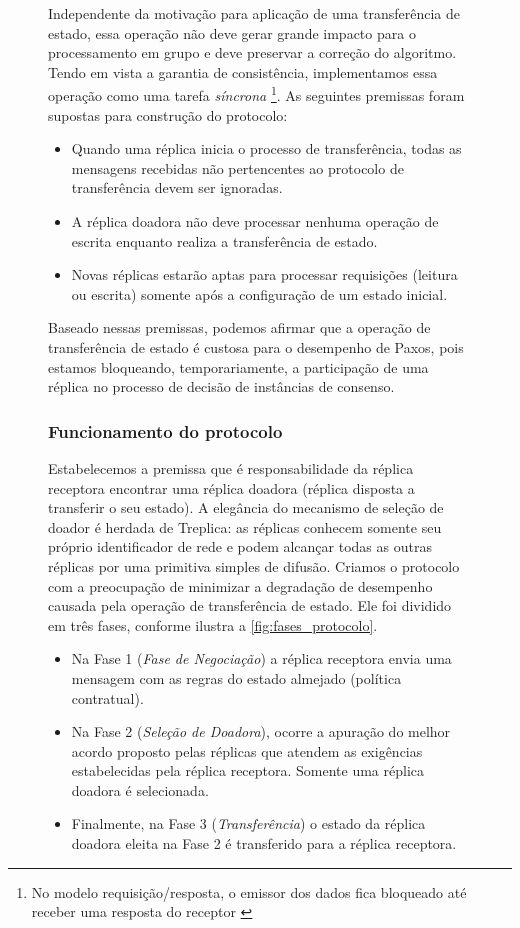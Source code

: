 \begin{figure}[ht]
Independente da motivação para aplicação de uma transferência de estado, essa operação
não deve gerar grande impacto para o processamento em grupo e deve preservar a correção do
algoritmo. Tendo em vista a garantia de consistência, implementamos essa operação como uma
tarefa \emph{síncrona} \footnote{No modelo requisição/resposta, o emissor dos dados fica
bloqueado até receber uma resposta do receptor \cite{coulouris11}}. As seguintes premissas
foram supostas para construção do protocolo:

\begin{itemize}
  \item Quando uma réplica inicia o processo de transferência, todas as mensagens
    recebidas não pertencentes ao protocolo de transferência devem ser ignoradas.
  \item A réplica doadora não deve processar nenhuma operação de escrita enquanto realiza
    a transferência de estado.
  \item Novas réplicas estarão aptas para processar requisições (leitura ou escrita)
    somente após a configuração de um estado inicial.
\end{itemize}

Baseado nessas premissas, podemos afirmar que a operação de transferência de estado é
custosa para o desempenho de Paxos, pois estamos bloqueando, temporariamente, a
participação de uma réplica no processo de decisão de instâncias de consenso.

\subsubsection{Funcionamento do protocolo}

Estabelecemos a premissa que é responsabilidade da réplica receptora encontrar uma réplica
doadora (réplica disposta a transferir o seu estado). A elegância do mecanismo de seleção
de doador é herdada de Treplica: as réplicas conhecem somente seu próprio identificador de
rede e podem alcançar todas as outras réplicas por uma primitiva simples de difusão.
Criamos o protocolo com a preocupação de minimizar a degradação de desempenho causada pela
operação de transferência de estado. Ele foi dividido em três fases, conforme ilustra a
\autoref{fig:fases_protocolo}.

\begin{itemize}
  \item Na Fase 1 (\emph{Fase de Negociação}) a réplica receptora envia uma mensagem com
    as regras do estado almejado (política contratual).
  \item Na Fase 2 (\emph{Seleção de Doadora}), ocorre a apuração do melhor acordo proposto
    pelas réplicas que atendem as exigências estabelecidas pela réplica receptora. Somente
    uma réplica doadora é selecionada.
  \item Finalmente, na Fase 3 (\emph{Transferência}) o estado da réplica doadora eleita na
    Fase 2 é transferido para a réplica receptora.
\end{itemize}


\end{figure}

